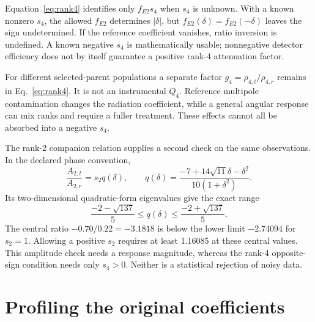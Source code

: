 \documentclass[pdflatex,iicol,sn-mathphys-num]{sn-jnl}
\begin{document}
Equation~\eqref{eq:rank4} identifies only \(f_{E2}s_4\) when \(s_4\) is unknown. With a known nonzero \(s_4\), the allowed \(f_{E2}\) determines \(\lvert\delta\rvert\), but \(f_{E2}(\delta)=f_{E2}(-\delta)\) leaves the sign undetermined. If the reference coefficient vanishes, ratio inversion is undefined. A known negative \(s_4\) is mathematically usable; nonnegative detector efficiency does not by itself guarantee a positive rank-4 attenuation factor.

For different selected-parent populations a separate factor \(g_4=\rho_{4,t}/\rho_{4,r}\) remains in Eq.~\eqref{eq:rank4}. It is not an instrumental \(Q_4\). Reference multipole contamination changes the radiation coefficient, while a general angular response can mix ranks and require a fuller treatment. These effects cannot all be absorbed into a negative \(s_4\).

The rank-2 companion relation supplies a second check on the same observations. In the declared phase convention,
\begin{equation}
 \frac{A_{2,t}}{A_{2,r}}=s_2 q(\delta),\qquad
 q(\delta)=\frac{-7+14\sqrt{11}\delta-\delta^2}{10(1+\delta^2)}.
 \label{eq:rank2}
\end{equation}
Its two-dimensional quadratic-form eigenvalues give the exact range
\begin{equation}
 \frac{-2-\sqrt{137}}5\le q(\delta)\le
 \frac{-2+\sqrt{137}}5.
\end{equation}
The central ratio \(-0.70/0.22=-3.1818\) is below the lower limit \(-2.74094\) for \(s_2=1\). Allowing a positive \(s_2\) requires at least 1.16085 at these central values. This amplitude check needs a response magnitude, whereas the rank-4 opposite-sign condition needs only \(s_4>0\). Neither is a statistical rejection of noisy data.

\section{Profiling the original coefficients}
\end{document}
